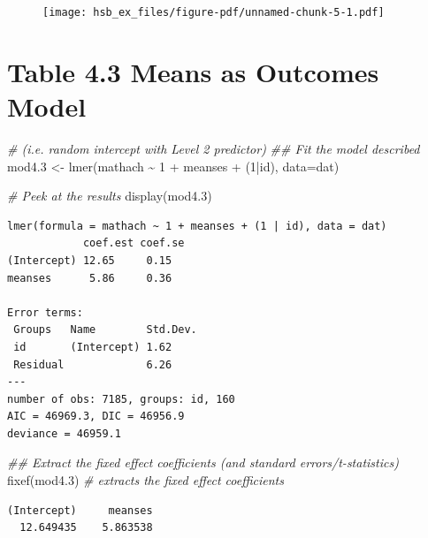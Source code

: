 \documentclass[
  letterpaper,
  DIV=11,
  numbers=noendperiod]{scrreprt}
\newenvironment{Shaded}{\begin{snugshade}}{\end{snugshade}}
\newcommand{\AttributeTok}[1]{\textcolor[rgb]{0.49,0.56,0.16}{#1}}
\newcommand{\CommentTok}[1]{\textcolor[rgb]{0.38,0.63,0.69}{\textit{#1}}}
\newcommand{\DecValTok}[1]{\textcolor[rgb]{0.25,0.63,0.44}{#1}}
\newcommand{\DocumentationTok}[1]{\textcolor[rgb]{0.73,0.13,0.13}{\textit{#1}}}
\newcommand{\FloatTok}[1]{\textcolor[rgb]{0.25,0.63,0.44}{#1}}
\newcommand{\FunctionTok}[1]{\textcolor[rgb]{0.02,0.16,0.49}{#1}}
\newcommand{\NormalTok}[1]{\textcolor[rgb]{0.00,0.44,0.13}{#1}}
\newcommand{\OtherTok}[1]{\textcolor[rgb]{0.00,0.44,0.13}{#1}}
\newcommand{\SpecialCharTok}[1]{\textcolor[rgb]{0.25,0.44,0.63}{#1}}
\begin{document}
\begin{figure}[H]

{\centering \texttt{[image: hsb\_ex\_files/figure-pdf/unnamed-chunk-5-1.pdf]}

}

\end{figure}

\hypertarget{table-4.3-means-as-outcomes-model}{%
\section{Table 4.3 Means as Outcomes
Model}\label{table-4.3-means-as-outcomes-model}}

\begin{Shaded}
\begin{Highlighting}[]
\CommentTok{\# (i.e. random intercept with Level 2 predictor)}
\DocumentationTok{\#\# Fit the model described }
\NormalTok{mod4}\FloatTok{.3} \OtherTok{\textless{}{-}} \FunctionTok{lmer}\NormalTok{(mathach }\SpecialCharTok{\textasciitilde{}} \DecValTok{1} \SpecialCharTok{+}\NormalTok{ meanses }\SpecialCharTok{+}\NormalTok{ (}\DecValTok{1}\SpecialCharTok{|}\NormalTok{id), }\AttributeTok{data=}\NormalTok{dat)}

\CommentTok{\# Peek at the results}
\FunctionTok{display}\NormalTok{(mod4}\FloatTok{.3}\NormalTok{)}
\end{Highlighting}
\end{Shaded}

\begin{verbatim}
lmer(formula = mathach ~ 1 + meanses + (1 | id), data = dat)
            coef.est coef.se
(Intercept) 12.65     0.15  
meanses      5.86     0.36  

Error terms:
 Groups   Name        Std.Dev.
 id       (Intercept) 1.62    
 Residual             6.26    
---
number of obs: 7185, groups: id, 160
AIC = 46969.3, DIC = 46956.9
deviance = 46959.1 
\end{verbatim}

\begin{Shaded}
\begin{Highlighting}[]
\DocumentationTok{\#\# Extract the fixed effect coefficients (and standard errors/t{-}statistics)}
\FunctionTok{fixef}\NormalTok{(mod4}\FloatTok{.3}\NormalTok{) }\CommentTok{\# extracts the fixed effect coefficients}
\end{Highlighting}
\end{Shaded}

\begin{verbatim}
(Intercept)     meanses 
  12.649435    5.863538 
\end{verbatim}
\end{document}
